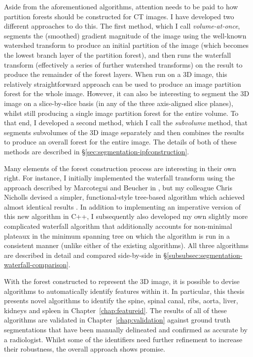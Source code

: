 Aside from the aforementioned algorithms, attention needs to be paid to how partition forests should be constructed for CT images. I have developed two different approaches to do this. The first method, which I call \emph{volume-at-once}, segments the (smoothed) gradient magnitude of the image using the well-known watershed transform \cite{beucher90} to produce an initial partition of the image (which becomes the lowest branch layer of the partition forest), and then runs the waterfall transform \cite{marcotegui05} (effectively a series of further watershed transforms) on the result to produce the remainder of the forest layers. When run on a 3D image, this relatively straightforward approach can be used to produce an image partition forest for the whole image. However, it can also be interesting to segment the 3D image on a slice-by-slice basis (in any of the three axis-aligned slice planes), whilst still producing a single image partition forest for the entire volume. To that end, I developed a second method, which I call the \emph{subvolume} method, that segments subvolumes of the 3D image separately and then combines the results to produce an overall forest for the entire image. The details of both of these methods are described in \S\ref{sec:segmentation-ipfconstruction}.

Many elements of the forest construction process are interesting in their own right. For instance, I initially implemented the waterfall transform using the approach described by Marcotegui and Beucher in \cite{marcotegui05}, but my colleague Chris Nicholls devised a simpler, functional-style tree-based algorithm which achieved almost identical results \cite{nicholls09}. In addition to implementing an imperative version of this new algorithm in C++, I subsequently also developed my own slightly more complicated waterfall algorithm that additionally accounts for non-minimal plateaux in the minimum spanning tree on which the algorithm is run in a consistent manner (unlike either of the existing algorithms). All three algorithms are described in detail and compared side-by-side in \S\ref{subsubsec:segmentation-waterfall-comparison}.

With the forest constructed to represent the 3D image, it is possible to devise algorithms to automatically identify features within it. In particular, this thesis presents novel algorithms to identify the spine, spinal canal, ribs, aorta, liver, kidneys and spleen in Chapter~\ref{chap:featureid}. The results of all of these algorithms are validated in Chapter~\ref{chap:validation} against ground truth segmentations that have been manually delineated and confirmed as accurate by a radiologist. Whilst some of the identifiers need further refinement to increase their robustness, the overall approach shows promise.

